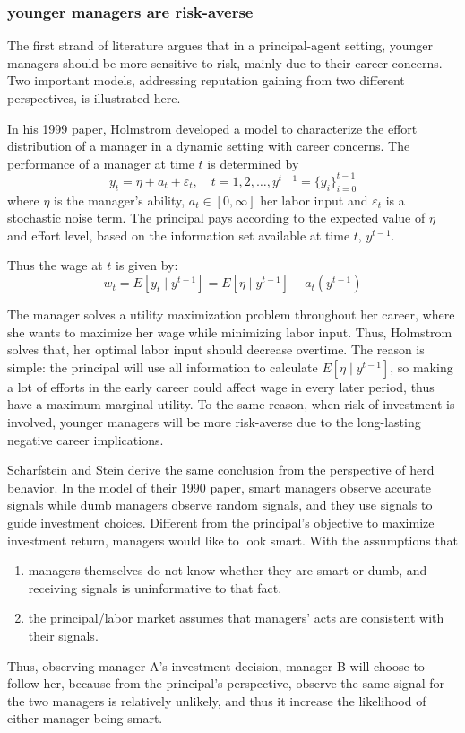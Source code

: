 \documentclass{article}
\begin{document}
\begin{CJK}{UTF8}{gbsn}
\subsubsection{younger managers are risk-averse}
The first strand of literature argues that in a principal-agent setting, younger managers should be more sensitive to risk, mainly due to their career concerns. Two important models, addressing reputation gaining from two different perspectives, is illustrated here.

In his 1999 paper\cite{holmstrom1999}, Holmstrom developed a model to characterize the effort distribution of a manager in a dynamic setting with career concerns. The performance of a manager at time $t$ is determined by 
$$
y_{t}=\eta+a_{t}+\varepsilon_{t}, \quad t=1,2, \ldots, y^{t-1} = \{y_i\}_{i=0}^{t-1}
$$
where $\eta$ is the manager's ability, $a_{t} \in[0, \infty]$ her labor input and $\varepsilon_{t}$ is a stochastic noise term. The principal pays according to the expected value of $\eta$ and effort level, based on the information set available at time $t$, $y^{t-1}$. 

Thus the wage at $t$ is given by:
$$
w_{t}=E\left[y_{t} \mid y^{t-1}\right]=E\left[\eta \mid y^{t-1}\right]+a_{t}\left(y^{t-1}\right)
$$

The manager solves a utility maximization problem throughout her career, where she wants to maximize her wage while minimizing labor input. Thus, Holmstrom solves that, her optimal labor input should decrease overtime. The reason is simple: the principal will use all information to calculate $E\left[\eta \mid y^{t-1}\right]$, so making a lot of efforts in the early career could affect wage in every later period, thus have a maximum marginal utility. To the same reason, when risk of investment is involved, younger managers will be more risk-averse due to the long-lasting negative career implications. 

Scharfstein and Stein derive the same conclusion from the perspective of herd behavior. In the model of their 1990 paper\cite{herd behavior}, smart managers observe accurate signals while dumb managers observe random signals, and they use signals to guide investment choices. Different from the principal's objective to maximize investment return, managers would like to look smart. With the assumptions that 

\begin{enumerate}
  \item managers themselves do not know whether they are smart or dumb, and receiving signals is uninformative to that fact.
  \item the principal/labor market assumes that managers' acts are consistent with their signals.
\end{enumerate}
Thus, observing manager A's investment decision, manager B will choose to follow her, because from the principal's perspective, observe the same signal for the two managers is relatively unlikely, and thus it increase the likelihood of either manager being smart. 


\end{CJK}
\end{document}
